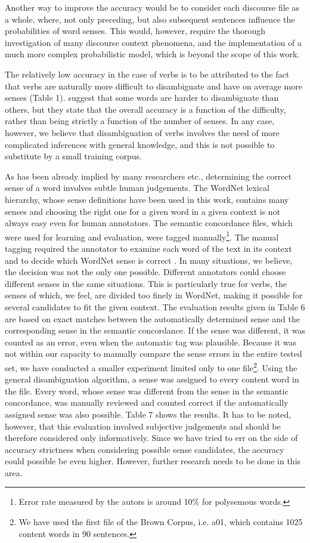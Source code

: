 Another way to improve the accuracy would be to consider each discourse file as a whole, where, not only preceding, but also subsequent sentences influence the probabilities of word senses. This would, however, require the thorough investigation of many discourse context phenomena, and the implementation of a much more complex probabilistic model, which is beyond the scope of this work.

The relatively low accuracy in the case of verbs is to be attributed to the fact that verbs are naturally more difficult to disambiguate and have on average more senses (Table 1). \cite{Leacock93} suggest that some words are harder to disambiguate than others, but they state that the overall accuracy is a function of the difficulty, rather than being strictly a function of the number of senses. In any case, however, we believe that disambiguation of verbs involves the need of more complicated inferences with general knowledge, and this is not possible to substitute by a small training corpus.

As has been already implied by many researchers \cite{Wilks90}\cite{Bruce94} etc., determining the correct sense of a word involves subtle human judgements. The WordNet lexical hierarchy, whose sense definitions have been used in this work, contains many senses and choosing the right one for a given word in a given context is not always easy even for human annotators. The semantic concordance files, which were used for learning and evaluation, were tagged manually\footnote{
Error rate measured by the autors is around 10\% for polysemous words.
}. The manual tagging required the annotator to examine each word of the text in its context and to decide which WordNet sense is correct \cite{Miller93}. In many situations, we believe, the decision was not the only one possible. Different annotators could choose different senses in the same situations. This is particularly true for verbs, the senses of which, we feel, are divided too finely in WordNet, making it possible for several candidates to fit the given context. The evaluation results given in Table 6 are based on exact matches between the automatically determined sense and the corresponding sense in the semantic concordance. If the sense was different, it was counted as an error, even when the automatic tag was plausible. Because it was not within our capacity to manually compare the sense errors in the entire tested set, we have conducted a smaller experiment limited only to one file\footnote{
We have used the first file of the Brown Corpus, i.e. a01, which contains 1025 content words in 90 sentences.
}. Using the general disambiguation algorithm, a sense was assigned to every content word in the file. Every word, whose sense was different from the sense in the semantic concordance, was manually reviewed and counted correct if the automatically assigned sense was also possible. Table 7 shows the results. It has to be noted, however, that this evaluation involved subjective judgements and should be therefore considered only informatively. Since we have tried to err on the side of accuracy strictness when considering possible sense candidates, the accuracy could possible be even higher. However, further research needs to be done in this area.


